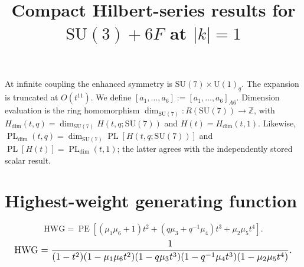 \documentclass[10pt]{article}
\title{Compact Hilbert-series results for $\mathrm{SU(3)}+6F$ at $\lvert k\rvert=1$}
\date{}
\newcommand{\PE}{\operatorname{PE}}
\begin{document}
\maketitle
At infinite coupling the enhanced symmetry is $\mathrm{SU}(7)\times\mathrm{U}(1)_q$.
The expansion is truncated at $O(t^{11})$.  We define
$[a_1,\ldots,a_{6}]
:=[a_1,\ldots,a_{6}]_{A6}$.
Dimension evaluation is the ring homomorphism
$\dim_{\mathrm{SU}(7)}:R(\mathrm{SU}(7))\to\mathbb{Z}$, with
$H_{\mathrm{dim}}(t,q)=\dim_{\mathrm{SU}(7)}H(t,q;\mathrm{SU}(7))$
and $H(t)=H_{\mathrm{dim}}(t,1)$.  Likewise,
$\operatorname{PL}_{\mathrm{dim}}(t,q)=\dim_{\mathrm{SU}(7)}
\operatorname{PL}[H(t,q;\mathrm{SU}(7))]$ and
$\operatorname{PL}[H(t)]=\operatorname{PL}_{\mathrm{dim}}(t,1)$;
the latter agrees with the independently stored scalar result.

\section{Highest-weight generating function}
\begin{equation}
\mathrm{HWG}=\PE\!\left[(\mu_1\mu_6+1)t^2+(q\mu_3+q^{-1}\mu_4)t^3+\mu_2\mu_5t^4\right].
\end{equation}
\begin{equation}
\resizebox{0.98\linewidth}{!}{${\displaystyle
\mathrm{HWG}=\frac{1}{(1-t^2)(1-\mu_1\mu_6t^2)(1-q\mu_3t^3)(1-q^{-1}\mu_4t^3)(1-\mu_2\mu_5t^4)}.}$}
\end{equation}
\end{document}

